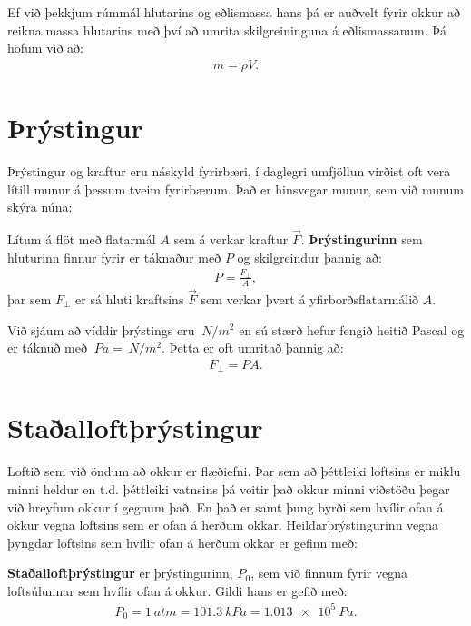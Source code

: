Ef við þekkjum rúmmál hlutarins og eðlismassa hans þá er auðvelt fyrir okkur að reikna massa hlutarins með því að umrita skilgreininguna á eðlismassanum. Þá höfum við að:
\begin{align*}
    m = \rho V.
\end{align*}

\section{Þrýstingur}
Þrýstingur og kraftur eru náskyld fyrirbæri, í daglegri umfjöllun virðist oft vera lítill munur á þessum tveim fyrirbærum. Það er hinsvegar munur, sem við munum skýra núna:

\begin{tcolorbox}
\begin{definition}
Lítum á flöt með flatarmál $A$ sem á verkar kraftur $\Vec{F}$. \textbf{Þrýstingurinn} sem hluturinn finnur fyrir er táknaður með $P$ og skilgreindur þannig að: 
\begin{align*}
    P = \frac{F_\perp}{A},
\end{align*}
þar sem $F_\perp$ er sá hluti kraftsins $\Vec{F}$ sem verkar þvert á yfirborðsflatarmálið $A$.
\end{definition}
\end{tcolorbox}
Við sjáum að víddir þrýstings eru $\SI{}{N/m^2}$ en sú stærð hefur fengið heitið Pascal og er táknuð með $\SI{}{Pa} = \SI{}{N/m^2}$. Þetta er oft umritað þannig að:
\begin{align*}
    F_\perp = P A.
\end{align*}

\section{Staðalloftþrýstingur}

Loftið sem við öndum að okkur er flæðiefni. Þar sem að þéttleiki loftsins er miklu minni heldur en t.d. þéttleiki vatnsins þá veitir það okkur minni viðstöðu þegar við hreyfum okkur í gegnum það. En það er samt þung byrði sem hvílir ofan á okkur vegna loftsins sem er ofan á herðum okkar. Heildarþrýstingurinn vegna þyngdar loftsins sem hvílir ofan á herðum okkar er gefinn með:


\begin{tcolorbox}
\begin{definition}
\textbf{Staðalloftþrýstingur} er þrýstingurinn, $P_0$, sem við finnum fyrir vegna loftsúlunnar sem hvílir ofan á okkur. Gildi hans er gefið með:
\begin{align*}
    P_0 = \SI{1}{atm} = \SI{101.3}{kPa} = \SI{1.013e5}{Pa}.
\end{align*}
\end{definition}
\end{tcolorbox}


